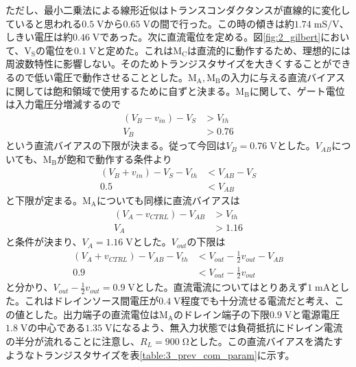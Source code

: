         ただし、最小二乗法による線形近似はトランスコンダクタンスが直線的に変化していると思われる$0.5\;\mathrm{V}$から$0.65\;\mathrm{V}$の間で行った。この時の傾きは約$1.74\;\mathrm{mS/V}$、しきい電圧は約$0.46\;\mathrm{V}$であった。次に直流電位を定める。図\ref{fig:2_gilbert}において、$\mathrm{V_{S}}$の電位を$0.1\;\mathrm{V}$と定めた。これは$\mathrm{M_{C}}$は直流的に動作するため、理想的には周波数特性に影響しない。そのためトランジスタサイズを大きくすることができるので低い電圧で動作させることとした。$\mathrm{M_{A},M_{B}}$の入力に与える直流バイアスに関しては飽和領域で使用するために自ずと決まる。$\mathrm{M_{B}}$に関して、ゲート電位は入力電圧分増減するので
        \begin{align*}
            \left( V_{B}-v_{in} \right) -V_{S} &> V_{th}  \\
            V_{B} &> 0.76
        \end{align*}
        という直流バイアスの下限が決まる。従って今回は$V_{B}=0.76\;\mathrm{V}$とした。$V_{AB}$についても、$\mathrm{M_{B}}$が飽和で動作する条件より
        \begin{align*}
            \left( V_{B}+v_{in} \right) - V_{S} -V_{th} &< V_{AB} - V_{S}   \\
            0.5 &< V_{AB}  
        \end{align*}
        と下限が定まる。$\mathrm{M_{A}}$についても同様に直流バイアスは
        \begin{align*}
            \left( V_{A}-v_{CTRL} \right) -V_{AB} &> V_{th}  \\
            V_{A} &> 1.16
        \end{align*}
        と条件が決まり、$V_{A}=1.16\;\mathrm{V}$とした。$V_{out}$の下限は
        \begin{align*}
            \left( V_{A}+v_{CTRL} \right) - V_{AB} -V_{th} &< V_{out} - \frac{1}{2}v_{out} - V_{AB}   \\
            0.9 &< V_{out} - \frac{1}{2}v_{out}
        \end{align*}
        と分かり、$V_{out}-\frac{1}{2}v_{out}=0.9\;\mathrm{V}$とした。直流電流についてはとりあえず$1\;\mathrm{mA}$とした。これはドレインソース間電圧が$0.4\;\mathrm{V}$程度でも十分流せる電流だと考え、この値とした。出力端子の直流電位は$\mathrm{M_{A}}$のドレイン端子の下限$0.9\;\mathrm{V}$と電源電圧$1.8\;\mathrm{V}$の中心である$1.35\;\mathrm{V}$になるよう、無入力状態では負荷抵抗にドレイン電流の半分が流れることに注意し、$R_{L}=900\;\mathrm{\Omega}$とした。この直流バイアスを満たすようなトランジスタサイズを表\ref{table:3_prev_com_param}に示す。\par
